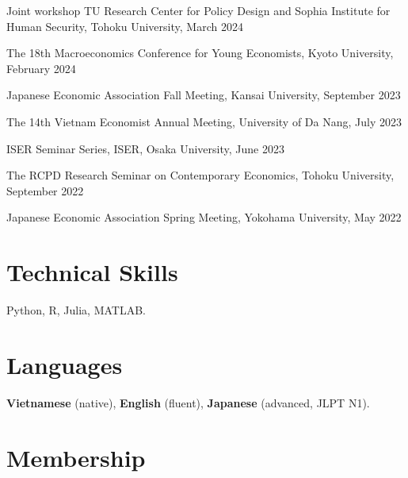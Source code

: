\documentclass[12pt]{article}
\begin{document}
\begin{enumerate}[label={[\arabic*]}]
\item Joint workshop TU Research Center for Policy Design and Sophia Institute for Human Security, Tohoku University, March 2024
\item The 18th Macroeconomics Conference for Young Economists, Kyoto University, February 2024
\item Japanese Economic Association Fall Meeting, Kansai University, September 2023
\item The 14th Vietnam Economist Annual Meeting, University of Da Nang, July 2023
\item ISER Seminar Series, ISER, Osaka University, June 2023
\item The RCPD Research Seminar on Contemporary Economics, Tohoku University, September 2022
\item Japanese Economic Association Spring Meeting, Yokohama University, May 2022
\end{enumerate}

%
%
%
%
%

\section{Technical Skills}

Python, R, Julia, MATLAB.

\section{Languages}

\textbf{Vietnamese} (native), \textbf{English} (fluent), \textbf{Japanese} (advanced, JLPT N1).

\section{Membership}
\end{document}
